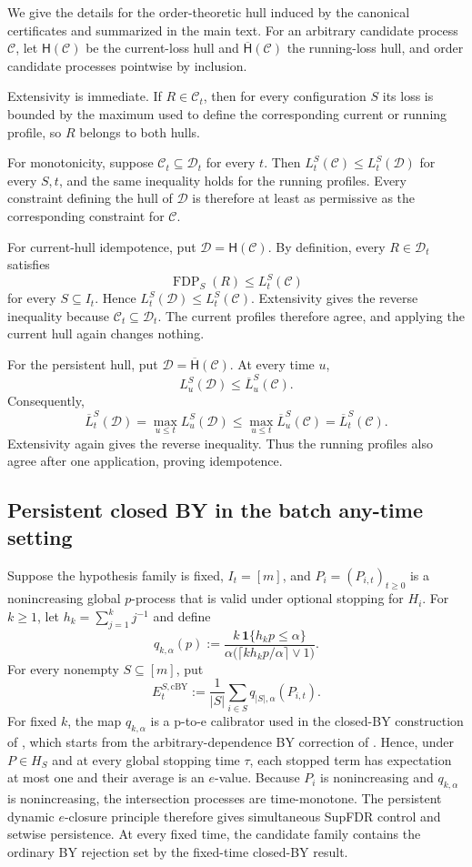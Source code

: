 \documentclass[11pt]{article}
\numberwithin{equation}{section}
\theoremstyle{plain}
\theoremstyle{definition}
\newcommand{\C}{\mathcal C}
\newcommand{\D}{\mathcal D}
\newcommand{\Hh}{\mathsf H}
\newcommand{\Hhsup}{\overline{\mathsf H}}
\newcommand{\FDP}{\operatorname{FDP}}
\newcommand{\loss}{L}
\newcommand{\runloss}{\overline L}
\newcommand{\one}{\mathbf 1}
\begin{document}
We give the details for the order-theoretic hull induced by the canonical certificates and summarized in the main text. For an arbitrary candidate process $\C$, let $\Hh(\C)$ be the current-loss hull and $\Hhsup(\C)$ the running-loss hull, and order candidate processes pointwise by inclusion.

Extensivity is immediate. If $R\in\C_t$, then for every configuration $S$ its loss is bounded by the maximum used to define the corresponding current or running profile, so $R$ belongs to both hulls.

For monotonicity, suppose $\C_t\subseteq\D_t$ for every $t$. Then $\loss_t^S(\C)\leq\loss_t^S(\D)$ for every $S,t$, and the same inequality holds for the running profiles. Every constraint defining the hull of $\D$ is therefore at least as permissive as the corresponding constraint for $\C$.

For current-hull idempotence, put $\D=\Hh(\C)$. By definition, every $R\in\D_t$ satisfies
\[
  \FDP_S(R)\leq\loss_t^S(\C)
\]
for every $S\subseteq I_t$. Hence $\loss_t^S(\D)\leq\loss_t^S(\C)$. Extensivity gives the reverse inequality because $\C_t\subseteq\D_t$. The current profiles therefore agree, and applying the current hull again changes nothing.

For the persistent hull, put $\D=\Hhsup(\C)$. At every time $u$,
\[
  \loss_u^S(\D)\leq\runloss_u^S(\C).
\]
Consequently,
\[
  \runloss_t^S(\D)
  =\max_{u\leq t}\loss_u^S(\D)
  \leq\max_{u\leq t}\runloss_u^S(\C)
  =\runloss_t^S(\C).
\]
Extensivity again gives the reverse inequality. Thus the running profiles also agree after one application, proving idempotence.


\subsection{Persistent closed BY in the batch any-time setting}\label{sup:closed-by}

Suppose the hypothesis family is fixed, $I_t=[m]$, and $P_i=(P_{i,t})_{t\geq0}$ is a nonincreasing global $p$-process that is valid under optional stopping for $H_i$. For $k\geq1$, let $h_k=\sum_{j=1}^k j^{-1}$ and define
\[
  q_{k,\alpha}(p)
  :=\frac{k\,\one\{h_kp\leq\alpha\}}
  {\alpha\bigl(\lceil kh_kp/\alpha\rceil\vee1\bigr)}.
\]
For every nonempty $S\subseteq[m]$, put
\[
  E_t^{S,\mathrm{cBY}}
  :=\frac1{|S|}\sum_{i\in S}q_{|S|,\alpha}(P_{i,t}).
\]
For fixed $k$, the map $q_{k,\alpha}$ is a p-to-e calibrator used in the closed-BY construction of \citet{XuEtAl2026Closure}, which starts from the arbitrary-dependence BY correction of \citet{BenjaminiYekutieli2001}. Hence, under $P\in H_S$ and at every global stopping time $\tau$, each stopped term has expectation at most one and their average is an $e$-value. Because $P_i$ is nonincreasing and $q_{k,\alpha}$ is nonincreasing, the intersection processes are time-monotone. The persistent dynamic $e$-closure principle therefore gives simultaneous SupFDR control and setwise persistence. At every fixed time, the candidate family contains the ordinary BY rejection set by the fixed-time closed-BY result.
\end{document}
